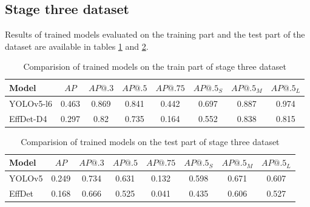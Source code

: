 \subsection{Stage three dataset}
Results of trained models evaluated on the training part and the test part of the dataset are available in tables \ref{tab:model_results:stage_three:train} and \ref{tab:model_results:stage_three:test}.

\begin{table}[H]
    \centering
    \begin{tabular}{|l|c|c|c|c|c|c|c|}
        \hline
        Model     & $AP$  & $AP@.3$ & $AP@.5$ & $AP@.75$ & $AP@.5_S$ & $AP@.5_M$ & $AP@.5_L$ \\ \hline
        YOLOv5-l6 & 0.463 & 0.869   & 0.841   & 0.442    & 0.697     & 0.887     & 0.974     \\ \hline
        EffDet-D4 & 0.297 & 0.82    & 0.735   & 0.164    & 0.552     & 0.838     & 0.815     \\ \hline
    \end{tabular}
    \caption{Comparision of trained models on the train part of stage three dataset}
    \label{tab:model_results:stage_three:train}
\end{table}

\begin{table}[H]
    \centering
    \begin{tabular}{|l|c|c|c|c|c|c|c|}
        \hline
        Model  & $AP$  & $AP@.3$ & $AP@.5$ & $AP@.75$ & $AP@.5_S$ & $AP@.5_M$ & $AP@.5_L$ \\ \hline
        YOLOv5 & 0.249 & 0.734   & 0.631   & 0.132    & 0.598     & 0.671     & 0.607     \\ \hline
        EffDet & 0.168 & 0.666   & 0.525   & 0.041    & 0.435     & 0.606     & 0.527     \\ \hline
    \end{tabular}
    \caption{Comparision of trained models on the test part of stage three dataset}
    \label{tab:model_results:stage_three:test}
\end{table}


